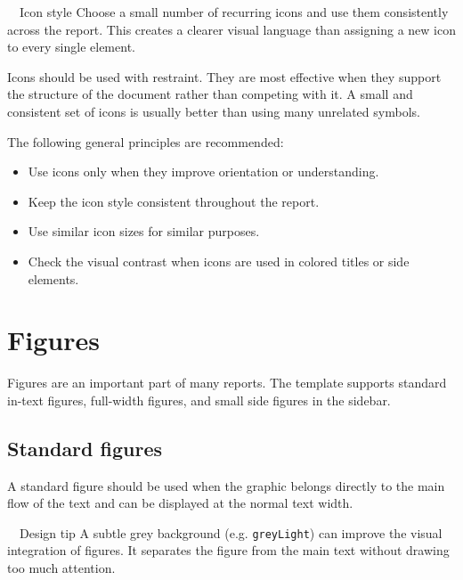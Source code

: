 \documentclass[11pt,a4paper]{report}
\begin{document}
\begin{sideBlock}[yellow]{~~Icon style}
Choose a small number of recurring icons and use them consistently across the report. This creates a clearer visual language than assigning a new icon to every single element.
\end{sideBlock}

Icons should be used with restraint. They are most effective when they support the structure of the document rather than competing with it. A small and consistent set of icons is usually better than using many unrelated symbols.

The following general principles are recommended:
\begin{itemize}
    \item Use icons only when they improve orientation or understanding.
    \item Keep the icon style consistent throughout the report.
    \item Use similar icon sizes for similar purposes.
    \item Check the visual contrast when icons are used in colored titles or side elements.
\end{itemize}

\clearpage


\chapter{Figures}

Figures are an important part of many reports. The template supports standard in-text figures, full-width figures, and small side figures in the sidebar.

\section{Standard figures}

A standard figure should be used when the graphic belongs directly to the main flow of the text and can be displayed at the normal text width.

\begin{coloredBlock}[turquoise]{~~Design tip}
A subtle grey background (e.g. \texttt{greyLight}) can improve the visual integration of figures. It separates the figure from the main text without drawing too much attention.
\end{coloredBlock}
\end{document}
